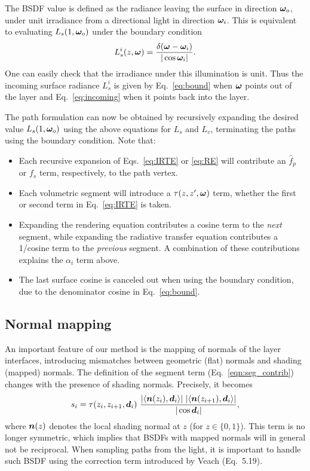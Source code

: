 The BSDF value is defined as the radiance leaving the surface in direction $\bm{\omega}_o$, under unit irradiance from a directional light in direction $\bm{\omega}_i$. This is equivalent to evaluating $L_s(1, \bm{\omega}_o)$ under the boundary condition
%
\begin{equation}
	\label{eq:bound}
	L_s^i(z, \bm{\omega}) = \frac{\delta(\bm{\omega} - \bm{\omega}_i)}{|\cos \bm{\omega}_i|}.
\end{equation}
%
One can easily check that the irradiance under this illumination is unit. Thus the incoming surface radiance $L^i_s$ is given by Eq.~\eqref{eq:bound} when $\bm{\omega}$ points out of the layer and Eq.~\eqref{eq:incoming} when it points back into the layer.

The path formulation can now be obtained by recursively expanding the desired value $L_s(1, \bm{\omega}_o)$ using the above equations for $L_s$ and $L_v$, terminating the paths using the boundary condition. Note that:
\begin{itemize}
	\item Each recursive expansion of Eqs.~\eqref{eq:IRTE} or \eqref{eq:RE} will contribute an $\hat f_p$ or $f_s$ term, respectively, to the path vertex.
	\item Each volumetric segment will introduce a $\tau(z, z', \bm{\omega})$ term, whether the first or second term in Eq.~\eqref{eq:IRTE} is taken.
	\item{Expanding the rendering equation contributes a cosine term to the \emph{next} segment, while expanding the radiative transfer equation contributes a 1/cosine term to the \emph{previous} segment. A combination of these contributions explains the $\alpha_i$ term above.}
	\item The last surface cosine is canceled out when using the boundary condition, due to the denominator cosine in Eq.~\eqref{eq:bound}.
\end{itemize}



\subsection{Normal mapping}

An important feature of our method is the mapping of normals of the layer interfaces, introducing mismatches between geometric (flat) normals and shading (mapped) normals. The definition of the segment term (Eq.~\eqref{eqn:seg_contrib}) changes with the presence of shading normals. Precisely, it becomes
\begin{equation}
s_i = \tau(z_i, z_{i+1}, \bm{d}_i) \ \frac{|\langle \bm{n}(z_i), \bm{d}_i \rangle| \ |\langle \bm{n}(z_{i + 1}), \bm{d}_i \rangle|}{|\cos \bm{d}_i|},
\end{equation}
where $\bm{n}(z)$ denotes the local shading normal at $z$ (for $z \in \{0, 1\}$). This term is no longer symmetric, which implies that BSDFs with mapped normals will in general not be reciprocal. When sampling paths from the light, it is important to handle such BSDF using the correction term introduced by Veach  (Eq.~5.19).


